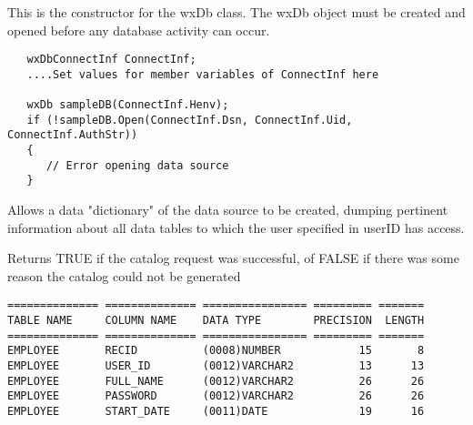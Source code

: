 

This is the constructor for the wxDb class.  The wxDb object must
be created and opened before any database activity can occur.

\begin{verbatim}
   wxDbConnectInf ConnectInf;
   ....Set values for member variables of ConnectInf here

   wxDb sampleDB(ConnectInf.Henv);
   if (!sampleDB.Open(ConnectInf.Dsn, ConnectInf.Uid, ConnectInf.AuthStr))
   {
      // Error opening data source
   }
\end{verbatim}


\label{wxdbcatalog}


Allows a data "dictionary" of the data source to be created, dumping pertinent information about all data tables to which the user specified in userID has access. 





Returns TRUE if the catalog request was successful, of FALSE if there was some reason the catalog could not be generated


\begin{verbatim}
============== ============== ================ ========= =======
TABLE NAME     COLUMN NAME    DATA TYPE        PRECISION  LENGTH
============== ============== ================ ========= =======
EMPLOYEE       RECID          (0008)NUMBER            15       8
EMPLOYEE       USER_ID        (0012)VARCHAR2          13      13
EMPLOYEE       FULL_NAME      (0012)VARCHAR2          26      26
EMPLOYEE       PASSWORD       (0012)VARCHAR2          26      26
EMPLOYEE       START_DATE     (0011)DATE              19      16
\end{verbatim}


\label{wxdbclose}

